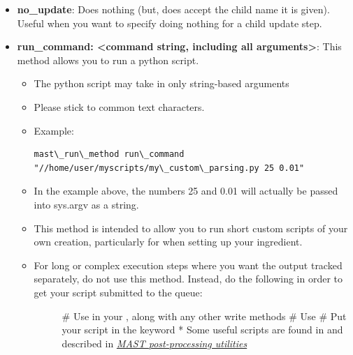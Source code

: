 \documentclass[letterpaper,10pt,english]{sphinxmanual}
\begin{document}
\begin{itemize}
\item {} 
\textbf{no\_update}: Does nothing (but, does accept the child name it is given). Useful when you want to specify doing nothing for a child update step.

\item {} 
\textbf{run\_command: \textless{}command string, including all arguments\textgreater{}}: This method allows you to run a python script.
\begin{itemize}
\item {} 
The python script may take in only string-based arguments

\item {} 
Please stick to common text characters.

\item {} 
Example:

\begin{Verbatim}[commandchars=\\\{\}]
mast\_run\_method run\_command "//home/user/myscripts/my\_custom\_parsing.py 25 0.01"
\end{Verbatim}

\item {} 
In the example above, the numbers 25 and 0.01 will actually be passed into sys.argv as a string.

\item {} 
This method is intended to allow you to run short custom scripts of your own creation, particularly for  when setting up your ingredient.

\item {} \begin{description}
\item[{For long or complex execution steps where you want the output tracked separately, do not use this method. Instead, do the following in order to get your script submitted to the queue:}] \leavevmode
\#  Use  in your , along with any other write methods
\#  Use 
\#  Put your script in the  keyword
*  Some useful scripts are found in  and described in {\hyperref[6_0_tools:tools]{\emph{MAST post-processing utilities}}}

\end{description}

\end{itemize}

\end{itemize}
\end{document}
